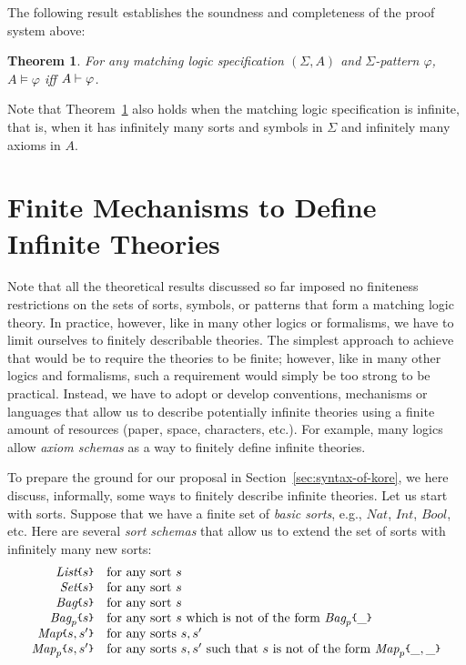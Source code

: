 \documentclass[UTF8,11pt]{article}
\newcounter{thmcounter}
\theoremstyle{plain}
\newtheorem{theorem}    [thmcounter]{Theorem}
\theoremstyle{definition}
\theoremstyle{remark}
\newcommand{\Nat}{\textit{Nat}}
\newcommand{\Int}{\textit{Int}}
\newcommand{\Bool}{\textit{Bool}}
\newcommand{\List}{\textit{List}}
\newcommand{\Bag}{\textit{Bag}}
\newcommand{\Set}{\textit{Set}}
\newcommand{\Map}{\textit{Map}}
\newcommand{\parametric}[2]{{#1}\raisebox{.2ex}{\texttt{\footnotesize{\{}}}#2\raisebox{.2ex}{\texttt{\footnotesize{\}}}}}
\begin{document}
The following result establishes the soundness and completeness
of the proof system above:

\begin{theorem}\cite{rosu-2017-lmcs}
\label{thm:completeness}
For any matching logic specification $(\Sigma,A)$ and $\Sigma$-pattern
$\varphi$, $A \models \varphi$ iff ${A}\vdash{\varphi}$.
\end{theorem}

Note that Theorem~\ref{thm:completeness} also holds when the matching logic
specification is infinite, that is, when it has infinitely many sorts and
symbols in $\Sigma$ and infinitely many axioms in $A$.


\section{Finite Mechanisms to Define Infinite Theories}

Note that all the theoretical results discussed so far imposed no finiteness
restrictions on the sets of sorts, symbols, or patterns that form a matching
logic theory.
In practice, however, like in many other logics or formalisms, we have to
limit ourselves to finitely describable theories.
The simplest approach to achieve that would be to require the theories to be
finite; however, like in many other logics and formalisms, such a requirement
would simply be too strong to be practical.
Instead, we have to adopt or develop conventions, mechanisms or languages that
allow us to describe potentially infinite theories using a finite amount of
resources (paper, space, characters, etc.).
For example, many logics allow \emph{axiom schemas} as a way to finitely
define infinite theories.

To prepare the ground for our proposal in Section~\ref{sec:syntax-of-kore},
we here discuss, informally, some ways to finitely describe infinite theories.
Let us start with sorts.
Suppose that we have a finite set of \emph{basic sorts}, e.g.,
$\Nat$, $\Int$, $\Bool$, etc.
Here are several \emph{sort schemas} that allow us to extend the set of sorts
with infinitely many new sorts:
$$
\begin{array}{rl}
\parametric{\List}{s} &
\textrm{for any sort $s$} \\
\parametric{\Set}{s} &
\textrm{for any sort $s$} \\
\parametric{\Bag}{s} &
\textrm{for any sort $s$} \\
\parametric{\Bag_p}{s} &
\textrm{for any sort $s$ which is not of the form $\parametric{\Bag_p}{\_}$} \\
\parametric{\Map}{s,s'} &
\textrm{for any sorts $s,s'$} \\
\parametric{\Map_p}{s,s'} &
\textrm{for any sorts $s,s'$ such that $s$ is not of the form $\parametric{\Map_p}{\_,\_}$}
\end{array}
$$
\end{document}
